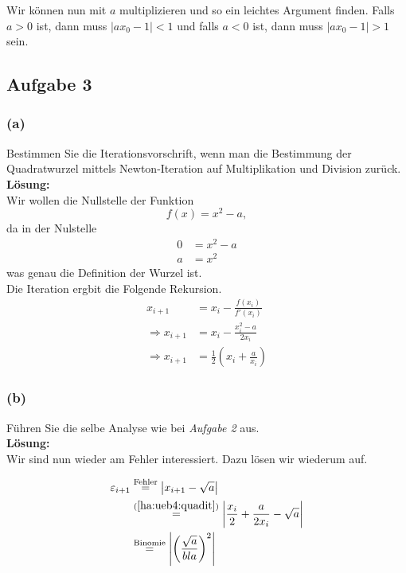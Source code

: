 \documentclass[11pt,a4paper,ngerman]{article}
\begin{document}
Wir können nun mit $a$ multiplizieren und so ein leichtes Argument finden. Falls
$a>0$ ist, dann muss $\left| ax_0 - 1 \right| < 1$ und falls $a<0$ ist, dann muss
$\left| ax_0 - 1\right| > 1$ sein.

\subsection*{Aufgabe 3}

\subsubsection*{(a)}

Bestimmen Sie die Iterationsvorschrift, wenn man die Bestimmung der Quadratwurzel mittels Newton-Iteration auf Multiplikation
und Division zurück.\\

\textbf{Lösung:}\\

Wir wollen die Nullstelle der Funktion
\begin{equation}
    f(x) = x^2 - a,
\end{equation}
da in der Nulstelle
\begin{equation*}\begin{split}
    0 &= x^2 - a\\
    a &= x^2
\end{split}\end{equation*}
was genau die Definition der Wurzel ist.\\

Die Iteration ergbit die Folgende Rekursion.
\begin{equation}\begin{split}\label{ha:ueb4:quadit}
    x_{i+1} &= x_i - \frac{f(x_i)}{f'(x_i)}\\
    \Rightarrow x_{i+1} &= x_i - \frac{x_i^2 - a}{2x_i}\\
    \Rightarrow x_{i+1} &= \frac{1}{2} (x_i + \frac{a}{x_i})
\end{split}\end{equation}

\subsubsection*{(b)}

Führen Sie die selbe Analyse wie bei \emph{Aufgabe 2} aus.\\

\textbf{Lösung:}\\

Wir sind nun wieder am Fehler interessiert. Dazu lösen wir wiederum auf.

\begin{equation}\begin{split}
    \varepsilon_{i+1} &\stackrel{\text{Fehler}}{=} \left| x_{i+1} - \sqrt{a} \right|\\
    &\stackrel{(\ref{ha:ueb4:quadit})}{=} \left| \frac{x_i}{2} + \frac{a}{2x_i} - \sqrt{a} \right|\\
    &\stackrel{\text{Binomie}}{=} \left| \left( \frac{\sqrt{a}}{bla}\right)^2 \right| 
\end{split}\end{equation}

\label{LastPage}
\end{document}

